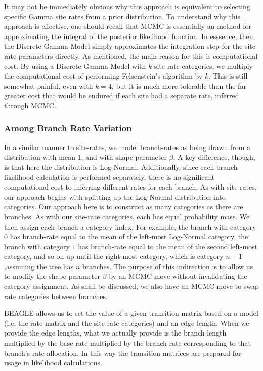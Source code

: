 \documentclass[10pt,journal,compsoc]{IEEEtran}
\begin{document}
It may not be immediately obvious why this approach is equivalent to selecting specific Gamma site rates from a prior distribution. To understand why this approach is effective, one should recall that MCMC is essentially an method for approximating the integral of the posterior likelihood function. In esssence, then, the Discrete Gamma Model simply approximates the integration step for the site-rate parameters directly. As mentioned, the main reason for this is computational cost. By using a Discrete Gamma Model with $k$ site-rate categories, we multiply the computational cost of performing Felsenstein's algorithm by $k$. This is still somewhat painful, even with $k=4$, but it is much more tolerable than the far greater cost that would be endured if each site had a separate rate, inferred through MCMC.

\subsubsection{Among Branch Rate Variation}

In a similar manner to site-rates, we model branch-rates as being drawn from a distribution with mean $1$, and with shape parameter $\beta$. A key difference, though, is that here the distribution is Log-Normal. Additionally, since each branch likelihood calculation is performed separately, there is no significant computational cost to inferring different rates for each branch. As with site-rates, our approach begins with splitting up the Log-Normal distribution into categories. Our approach here is to construct as many categories as there are branches. As with our site-rate categories, each has equal probability mass. We then assign each branch a category index. For example, the branch with category $0$ has branch-rate equal to the mean of the left-most Log-Normal category, the branch with category $1$ has branch-rate equal to the mean of the second left-most category, and so on up until the right-most category, which is category $n - 1$,assuming the tree has $n$ branches. The purpose of this indirection is to allow us to modify the shape parameter $\beta$ by an MCMC move without invalidating the category assignment. As shall be discussed, we also have an MCMC move to swap rate categories between branches.

BEAGLE allows us to set the value of a given transition matrix based on a model (i.e. the rate matrix and the site-rate categories) and an edge length. When we provide the edge lengths, what we actually provide is the branch length multiplied by the base rate multiplied by the branch-rate corresponding to that branch's rate allocation. In this way the transition matrices are prepared for usage in likelihood calculations.
\end{document}
